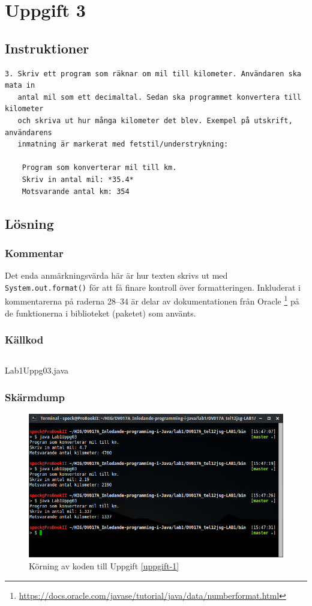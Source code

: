 \section{Uppgift 3}\label{uppgift-3}

\subsection{Instruktioner}
\begin{verbatim}
3. Skriv ett program som räknar om mil till kilometer. Användaren ska mata in
   antal mil som ett decimaltal. Sedan ska programmet konvertera till kilometer
   och skriva ut hur många kilometer det blev. Exempel på utskrift, användarens
   inmatning är markerat med fetstil/understrykning:

    Program som konverterar mil till km.
    Skriv in antal mil: *35.4*
    Motsvarande antal km: 354
\end{verbatim}

\subsection{Lösning}
\subsubsection{Kommentar}
Det enda anmärkningsvärda här är hur texten skrivs ut med
\texttt{System.out.format()} för att få finare kontroll över formatteringen.
Inkluderat i kommentarerna på raderna \numrange{28}{34} är delar av
dokumentationen från Oracle
\footnote{\url{https://docs.oracle.com/javase/tutorial/java/data/numberformat.html}}
på de funktionerna i biblioteket (paketet) som använts.


\subsubsection{Källkod}\label{uppgift-3_src}
    \inputminted[linenos]{java}{src/Lab1Uppg03.java}
    \caption{Lab1Uppg03.java}
    \label{Uppg3src}

\subsubsection{Skärmdump}
\begin{figure}[htbp]
    \centering
        \includegraphics[width=\linewidth]{img/03.png}
    \caption{Körning av koden till Uppgift \ref{uppgift-1}}
    \label{fig:screenshot-03}
\end{figure}
